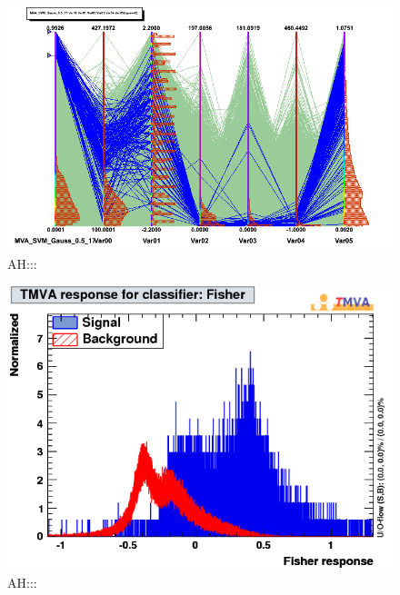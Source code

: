 \documentclass[a4paper]{jpconf}
\begin{document}
\begin{figure}[h]
\begin{center}
\includegraphics[width=1.0\textwidth]{images/svm_parallels2.png}
\caption{\label{label}AH:::}
\end{center}
\end{figure}



\begin{figure}[h]
\begin{center}
\includegraphics[width=1.0\textwidth]{images/mva_Fisher.png}
\caption{\label{label}AH:::}
\end{center}
\end{figure}
\end{document}

